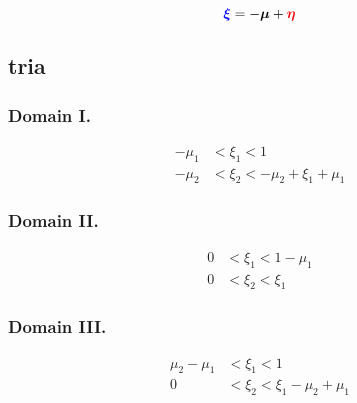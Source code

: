 \documentclass{article}
\begin{document}
\begin{equation}
{\color{blue}\bm{\xi}} = -\bm{\mu} + {\color{red}\bm{\eta}}
\end{equation}


\subsection{tria}

\newcommand{\commontri}{
\path [draw=gray] (1,0) -- (1,1) -- (0,1) -- (-1,0) -- (-1,-1) -- (0,-1) -- cycle;
\path [draw=gray] (-1,0) -- (1,0);
\path [draw=gray] (0,-1) -- (0,1);
\path [draw=gray] (-1,-1) -- (1,1);
\path [draw, ->] (-.2,0) -- (1.2,0) node [anchor = west] {$\xi_1$};
\path [draw, ->] (0,-.2) -- (0,1.2) node [anchor = south] {$\xi_2$};
\path [fill=red, opacity=.5] (0-\m,0-\p) -- (1-\m,0-\p) -- (1-\m,1-\p) -- cycle;
\path [fill = blue, opacity=.5] (0,0) -- (1,0) -- (1,1) -- cycle;
\path [draw, fill] (\m,\p) circle(.03) -- (-\m,-\p) circle(.03);
}


\subsubsection{Domain I.}
%
%
\begin{align}
-\mu_1 &< \xi_1 < 1 \nonumber \\
-\mu_2 &< \xi_2 < -\mu_2 + \xi_1+\mu_1 \nonumber
\end{align}


\subsubsection{Domain II.}
%
%
\begin{align}
0 &< \xi_1 < 1-\mu_1 \nonumber \\
0 &< \xi_2 < \xi_1 \nonumber
\end{align}



\subsubsection{Domain III.}
%
%
\begin{align}
\mu_2-\mu_1 &< \xi_1 < 1 \nonumber \\
0 &< \xi_2 < \xi_1 - \mu_2+\mu_1\nonumber
\end{align}
\end{document}
